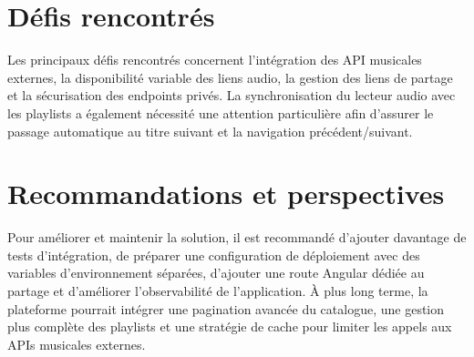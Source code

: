 \documentclass[12pt,a4paper]{report}
\begin{document}
\section*{Défis rencontrés}

Les principaux défis rencontrés concernent l'intégration des API musicales
externes, la disponibilité variable des liens audio, la gestion des liens de
partage et la sécurisation des endpoints privés. La synchronisation du lecteur
audio avec les playlists a également nécessité une attention particulière afin
d'assurer le passage automatique au titre suivant et la navigation
précédent/suivant.

\section*{Recommandations et perspectives}

Pour améliorer et maintenir la solution, il est recommandé d'ajouter davantage
de tests d'intégration, de préparer une configuration de déploiement avec des
variables d'environnement séparées, d'ajouter une route Angular dédiée au
partage et d'améliorer l'observabilité de l'application. À plus long terme, la
plateforme pourrait intégrer une pagination avancée du catalogue, une gestion
plus complète des playlists et une stratégie de cache pour limiter les appels
aux APIs musicales externes.
\end{document}
